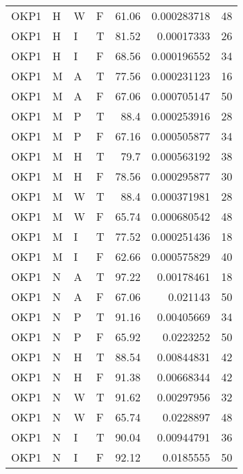 \begin{table}[!htb]
{\begin{tabular}{llllrrr}
            OKP1     & H     & W     & F          & 61.06      & 0.000283718 & 48       \\
            OKP1     & H     & I     & T          & 81.52      & 0.00017333  & 26       \\
            OKP1     & H     & I     & F          & 68.56      & 0.000196552 & 34       \\
            OKP1     & M     & A     & T          & 77.56      & 0.000231123 & 16       \\
            OKP1     & M     & A     & F          & 67.06      & 0.000705147 & 50       \\
            OKP1     & M     & P     & T          & 88.4       & 0.000253916 & 28       \\
            OKP1     & M     & P     & F          & 67.16      & 0.000505877 & 34       \\
            OKP1     & M     & H     & T          & 79.7       & 0.000563192 & 38       \\
            OKP1     & M     & H     & F          & 78.56      & 0.000295877 & 30       \\
            OKP1     & M     & W     & T          & 88.4       & 0.000371981 & 28       \\
            OKP1     & M     & W     & F          & 65.74      & 0.000680542 & 48       \\
            OKP1     & M     & I     & T          & 77.52      & 0.000251436 & 18       \\
            OKP1     & M     & I     & F          & 62.66      & 0.000575829 & 40       \\
            OKP1     & N     & A     & T          & 97.22      & 0.00178461  & 18       \\
            OKP1     & N     & A     & F          & 67.06      & 0.021143    & 50       \\
            OKP1     & N     & P     & T          & 91.16      & 0.00405669  & 34       \\
            OKP1     & N     & P     & F          & 65.92      & 0.0223252   & 50       \\
            OKP1     & N     & H     & T          & 88.54      & 0.00844831  & 42       \\
            OKP1     & N     & H     & F          & 91.38      & 0.00668344  & 42       \\
            OKP1     & N     & W     & T          & 91.62      & 0.00297956  & 32       \\
            OKP1     & N     & W     & F          & 65.74      & 0.0228897   & 48       \\
            OKP1     & N     & I     & T          & 90.04      & 0.00944791  & 36       \\
            OKP1     & N     & I     & F          & 92.12      & 0.0185555   & 50       \\
            \hline
        \end{tabular}
    }{}
\end{table}